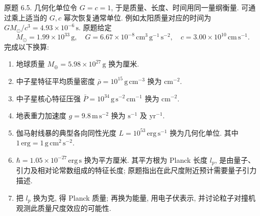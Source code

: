 \begin{exercise}
原题 6.5. 几何化单位令 $G=c=1$, 于是质量、长度、时间用同一量纲衡量. 可通过乘上适当的 $G,c$ 幂次恢复通常单位. 例如太阳质量对应的时间为 $GM_\odot/c^3=4.93\times10^{-6}\,\mathrm s$. 原题给定
\[
M_\odot=1.99\times10^{33}\,\mathrm g,\quad
G=6.67\times10^{-8}\,\mathrm{cm^3\,g^{-1}\,s^{-2}},\quad
c=3.00\times10^{10}\,\mathrm{cm\,s^{-1}}.
\]
完成以下换算:
\begin{enumerate}[label=(\alph*)]
\item 地球质量 $M_\oplus=5.98\times10^{27}\,\mathrm g$ 换为厘米.
\item 中子星特征平均质量密度 $\bar\rho=10^{15}\,\mathrm{g\,cm^{-3}}$ 换为 $\mathrm{cm^{-2}}$.
\item 中子星核心特征压强 $\bar P=10^{34}\,\mathrm{g\,s^{-2}\,cm^{-1}}$ 换为 $\mathrm{cm^{-2}}$.
\item 地表重力加速度 $g=9.8\,\mathrm{m\,s^{-2}}$ 换为 $\mathrm{s^{-1}}$ 及 $\mathrm{yr^{-1}}$.
\item 伽马射线暴的典型各向同性光度 $L=10^{53}\,\mathrm{erg\,s^{-1}}$ 换为几何化单位. 其中 $1\,\mathrm{erg}=1\,\mathrm{g\,cm^2\,s^{-2}}$.
\item $\hbar=1.05\times10^{-27}\,\mathrm{erg\,s}$ 换为平方厘米. 其平方根为 Planck 长度 $l_p$, 是由量子、引力及相对论常数组成的特征长度; 原题指出在此尺度附近预计需要量子引力描述.
\item 把 $l_p$ 换为克, 得 Planck 质量; 再换为能量, 用电子伏表示, 并讨论粒子对撞机观测此质量尺度效应的可能性.
\end{enumerate}
\end{exercise}
